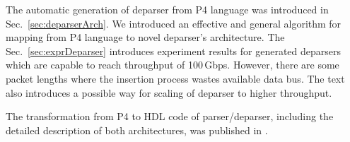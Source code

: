 The automatic generation of deparser from P4 language was introduced in Sec.~\ref{sec:deparserArch}. 
We introduced an effective and general algorithm for mapping from P4 language to novel deparser's architecture. 
The Sec.~\ref{sec:exprDeparser} introduces experiment results for generated deparsers which are capable to reach throughput of 100\,Gbps.
However, there are some packet lengths where the insertion process wastes available data bus. 
The text also introduces a possible way for scaling of deparser to higher throughput.

The transformation from P4 to HDL code of parser/deparser, including the detailed description of both architectures, was published in 
\cite{2016fccm-p4-parser,2015h2rc-p4-parser,2016pesw, 2016stanford-p4-demo,2016MicproP4}.